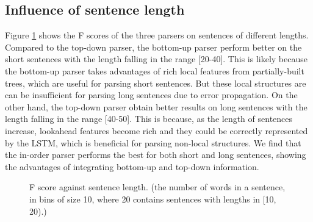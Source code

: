 \documentclass[11pt,letterpaper]{article}
\begin{document}
\subsection{Influence of sentence length}
Figure \ref{length} shows the F scores of the three parsers on sentences of different lengths.
Compared to the top-down parser, the bottom-up parser perform better on the short sentences with the length falling in the range [20-40].
This is likely because the bottom-up parser takes advantages of rich local features from partially-built trees, which are useful for parsing short sentences.
But these local structures are can be insufficient for parsing long sentences due to error propagation.
On the other hand, the top-down parser obtain better results on long sentences with the length falling in the range [40-50].
This is because, as the length of sentences increase, lookahead features become rich and they could be correctly represented by the LSTM, which is beneficial for parsing non-local structures.
We find that the in-order parser performs the best for both short and long sentences, showing the advantages of integrating bottom-up and top-down information.
\begin{figure}[!tp]
\caption{F score against sentence length. (the number of words in a sentence, in bins of size 10, where 20 contains sentences with lengths in [10, 20).)}
\label{length} 
\end{figure}
\end{document}
